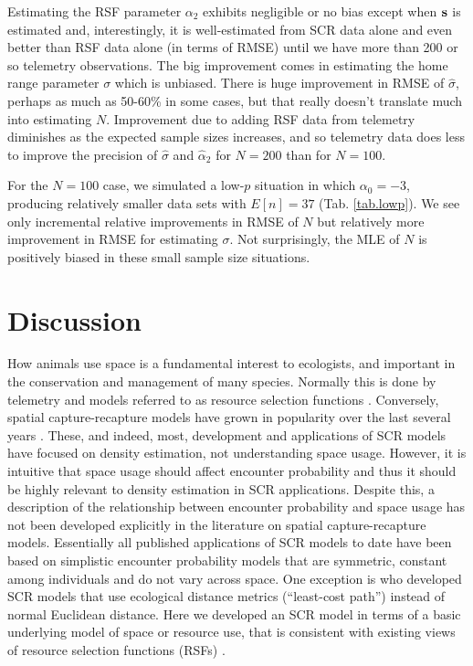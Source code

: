 \documentclass[12pt]{article}
\begin{document}
Estimating the RSF parameter $\alpha_{2}$ exhibits negligible or no
bias except when ${\bf s}$ is estimated and, interestingly, it is
well-estimated from SCR data alone and even better than RSF data alone
(in terms of RMSE) until we have more than 200 or so telemetry
observations.  The big improvement comes in estimating the home range
parameter $\sigma$ which is unbiased.
There is huge
improvement in RMSE of $\hat{\sigma}$, perhaps as much as 50-60\% in
some cases, but that really doesn't translate much into estimating
$N$.  Improvement due to adding RSF data from telemetry diminishes as
the expected sample sizes increases, and so telemetry data does less
to improve the precision of
$\hat{\sigma}$ and $\hat{\alpha}_{2}$
for $N=200$ than for $N=100$.

For the $N=100$ case,
we simulated a low-$p$ situation  in which $\alpha_{0}=-3$, producing
relatively smaller data sets with  $E[n] = 37$
(Tab. \ref{tab.lowp}). We see
only incremental relative improvements in RMSE of $N$ but relatively more
improvement in RMSE for estimating $\sigma$. Not surprisingly, the MLE of
$N$ is positively biased in these small sample size situations.









\section{Discussion}


How animals use space is a fundamental interest to ecologists, and
important in the conservation and management of many species.
Normally this is done
by telemetry and models referred to as resource selection functions
\citep{manly_etal:2002}.  Conversely, spatial capture-recapture models
have grown in popularity over the last several years
\citep{efford:2004,borchers_efford:2008, royle:2008,
  efford_etal:2009ecol,royle_etal:2009ecol, gardner_etal:2010ecol,
  gardner_etal:2010jwm, kery_etal:2010,
  sollmann_etal:2011,mollet_etal:2012,gopalaswamy_etal:2012}. These,
and indeed, most,
 development and applications of SCR models have focused on density
estimation, not understanding space usage.  However, it is intuitive that space
usage should affect encounter probability and thus it should be highly relevant
to density estimation in SCR applications. Despite this, a description
of the
relationship between encounter 
 probability and space usage has not
been developed explicitly in the literature on spatial
capture-recapture models.  Essentially all
published applications of SCR models to date have been based on
simplistic encounter
probability models that are symmetric, constant
among individuals and do not vary across space. One exception is
\citet{royle_etal:2012ecol} who developed SCR models that use
ecological distance metrics (``least-cost path'')
instead of normal Euclidean distance. Here
we developed an SCR model in terms of a basic underlying model of
space or resource use, that is consistent with existing views of
resource selection functions (RSFs) \citep{manly_etal:2002}.
\end{document}
